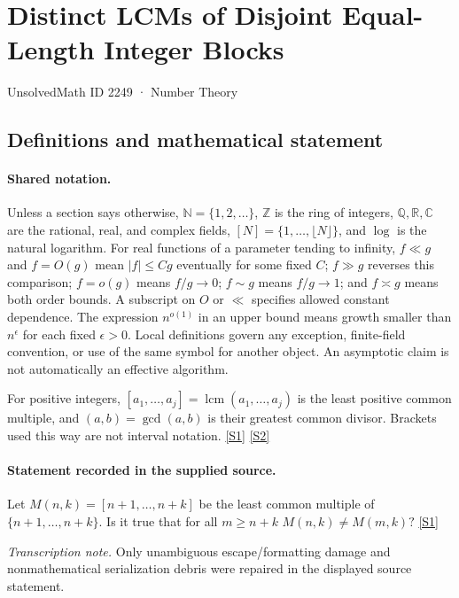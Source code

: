 \documentclass[11pt,a4paper]{article}
\newcommand{\N}{\mathbb{N}}
\newcommand{\Z}{\mathbb{Z}}
\newcommand{\Q}{\mathbb{Q}}
\newcommand{\R}{\mathbb{R}}
\newcommand{\C}{\mathbb{C}}
\newcommand{\sref}[2]{\hyperlink{source:#1:#2}{[S#2]}}
\begin{document}

\setcounter{section}{2248}

\section{Distinct LCMs of Disjoint Equal-Length Integer Blocks}\label{2249}

{\small\sffamily UnsolvedMath ID 2249 · Number Theory}

\subsection{Definitions and mathematical statement}

\paragraph{Shared notation.}Unless a section says otherwise, $\N=\{1,2,\ldots\}$,
$\Z$ is the ring of integers, $\Q,\R,\C$ are the rational, real, and complex
fields, $[N]=\{1,\ldots,\lfloor N\rfloor\}$, and $\log$ is the natural
logarithm. For real functions of a parameter tending to infinity,
$f\ll g$ and $f=O(g)$ mean $|f|\leq Cg$ eventually for some fixed $C$;
$f\gg g$ reverses this comparison; $f=o(g)$ means $f/g\to0$;
$f\sim g$ means $f/g\to1$; and $f\asymp g$ means both order bounds.
A subscript on $O$ or $\ll$ specifies allowed constant dependence.
The expression $n^{o(1)}$ in an upper bound means growth smaller than
$n^\epsilon$ for each fixed $\epsilon>0$. Local definitions govern any
exception, finite-field convention, or use of the same symbol for another
object. An asymptotic claim is not automatically an effective algorithm.



For positive integers, $[a_1,\ldots,a_j]=\operatorname{lcm}(a_1,\ldots,a_j)$ is the least positive common multiple, and $(a,b)=\gcd(a,b)$ is their greatest common divisor. Brackets used this way are not interval notation. \sref{2249}{1} \sref{2249}{2}

\paragraph{Statement recorded in the supplied source.}
Let $M(n,k)=[n+1,\ldots,n+k]$ be the least common multiple of $\{n+1,\ldots,n+k\}$.
Is it true that for all $m\geq n+k$ $ M(n,k) \neq M(m,k)? $ \sref{2249}{1}

{\small\emph{Transcription note.} Only unambiguous escape/formatting damage and nonmathematical serialization debris were repaired in the displayed source statement.}
\end{document}
